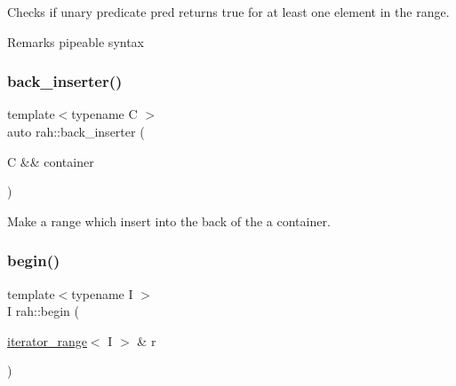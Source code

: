 Checks if unary predicate pred returns true for at least one element in the range. 

\begin{DoxyRemark}{Remarks}
pipeable syntax
\end{DoxyRemark}

\begin{DoxyCodeInclude}{0}
\DoxyCodeLine{        ));}
\end{DoxyCodeInclude}
\mbox{\label{namespacerah_a0698f952bc3c4f1961929bbddb5812fe}} 
\subsubsection{\texorpdfstring{back\_inserter()}{back\_inserter()}}
{\footnotesize\ttfamily template$<$typename C $>$ \\
auto rah\+::back\+\_\+inserter (\begin{DoxyParamCaption}\item[{C \&\&}]{container }\end{DoxyParamCaption})}



Make a range which insert into the back of the a container. 


\begin{DoxyCodeInclude}{0}
\end{DoxyCodeInclude}
\mbox{\label{namespacerah_a2c4a19e57cc4e0753e93830f247def6d}} 
\subsubsection{\texorpdfstring{begin()}{begin()}\hspace{0.1cm}{\footnotesize\ttfamily [1/2]}}
{\footnotesize\ttfamily template$<$typename I $>$ \\
I rah\+::begin (\begin{DoxyParamCaption}\item[{\mbox{\hyperlink{structrah_1_1iterator__range}{iterator\+\_\+range}}$<$ I $>$ \&}]{r }\end{DoxyParamCaption})}



